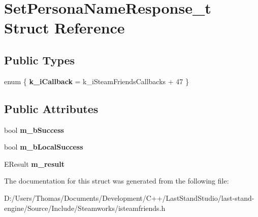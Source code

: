 \hypertarget{structSetPersonaNameResponse__t}{}\section{Set\+Persona\+Name\+Response\+\_\+t Struct Reference}
\label{structSetPersonaNameResponse__t}
\subsection*{Public Types}
\begin{DoxyCompactItemize}
\item 
\hypertarget{structSetPersonaNameResponse__t_abba6876732401b6b2c076602a3fdc7bd}{}enum \{ {\bfseries k\+\_\+i\+Callback} = k\+\_\+i\+Steam\+Friends\+Callbacks + 47
 \}\label{structSetPersonaNameResponse__t_abba6876732401b6b2c076602a3fdc7bd}

\end{DoxyCompactItemize}
\subsection*{Public Attributes}
\begin{DoxyCompactItemize}
\item 
\hypertarget{structSetPersonaNameResponse__t_a6ddad6becef13bb26f86bb30a68336d3}{}bool {\bfseries m\+\_\+b\+Success}\label{structSetPersonaNameResponse__t_a6ddad6becef13bb26f86bb30a68336d3}

\item 
\hypertarget{structSetPersonaNameResponse__t_a36ac5899a48214b56d114999ca8bf9b9}{}bool {\bfseries m\+\_\+b\+Local\+Success}\label{structSetPersonaNameResponse__t_a36ac5899a48214b56d114999ca8bf9b9}

\item 
\hypertarget{structSetPersonaNameResponse__t_a388b9cff658ab622dc69378b59bc118e}{}E\+Result {\bfseries m\+\_\+result}\label{structSetPersonaNameResponse__t_a388b9cff658ab622dc69378b59bc118e}

\end{DoxyCompactItemize}


The documentation for this struct was generated from the following file\+:\begin{DoxyCompactItemize}
\item 
D\+:/\+Users/\+Thomas/\+Documents/\+Development/\+C++/\+Last\+Stand\+Studio/last-\/stand-\/engine/\+Source/\+Include/\+Steamworks/isteamfriends.\+h\end{DoxyCompactItemize}
